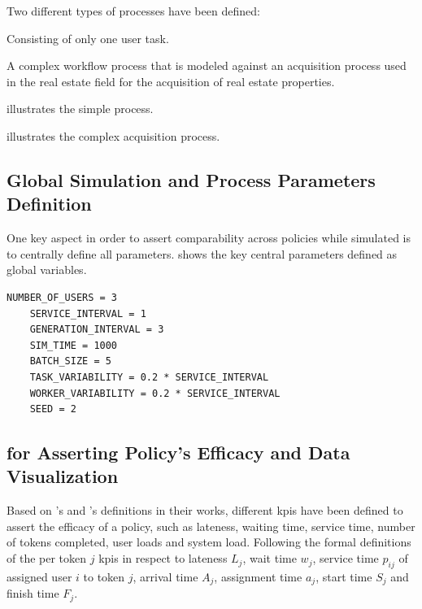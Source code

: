 \documentclass[draft=false]{seal_thesis}
\begin{document}
Two different types of processes have been defined:
\begin{enumerate*}
	\item Consisting of only one user task.
	\item A complex workflow process that is modeled against an acquisition process used in the real estate field for the acquisition of real estate properties.
\end{enumerate*}

 illustrates the simple process.


 illustrates the complex acquisition process.


\subsection{Global Simulation and Process Parameters Definition}

One key aspect in order to assert comparability across policies while simulated is to centrally define all parameters.  shows the key central parameters defined as global variables.

\begin{lstlisting}[caption=Global parameters definition that ensures comparability across simulation runs,label=lst:central_parameters,style=CustomPython]
	NUMBER_OF_USERS = 3
	SERVICE_INTERVAL = 1
	GENERATION_INTERVAL = 3
	SIM_TIME = 1000
	BATCH_SIZE = 5
	TASK_VARIABILITY = 0.2 * SERVICE_INTERVAL
	WORKER_VARIABILITY = 0.2 * SERVICE_INTERVAL
	SEED = 2
\end{lstlisting}

\subsection{ for Asserting Policy's Efficacy and Data Visualization}

Based on \citet{Pinedo2008}'s and \citet{Zeng2005}'s definitions in their works, different \glspl{kpi} have been defined to assert the efficacy of a policy, such as lateness, waiting time, service time, number of tokens completed, user loads and system load. Following the formal definitions of the per token $j$ \glspl{kpi} in respect to lateness $L_j$, wait time $w_j$, service time $p_{ij}$ of assigned user $i$ to token $j$, arrival time $A_j$, assignment time $a_j$, start time $S_j$ and finish time $F_j$.
\end{document}
